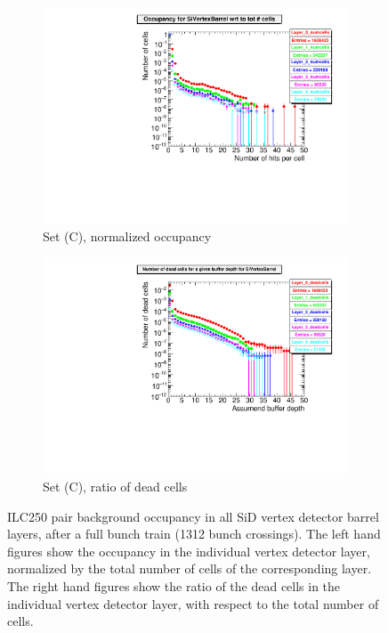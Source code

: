   \begin{figure}[htb]\ContinuedFloat
     \begin{subfigure}[b]{0.49\textwidth}
   \centering
    \includegraphics[width=\textwidth]{Figures/Pairs/occupancy_numcells_SiVertexBarrel_ILC250_SetC.pdf}
   \caption{Set (C), normalized occupancy}
   \end{subfigure}
   \hfill
    \begin{subfigure}[b]{0.49\textwidth}
   \centering
   \includegraphics[width=\textwidth]{Figures/Pairs/occupancy_deadcells_SiVertexBarrel_ILC250_SetC.pdf}
   \caption{Set (C), ratio of dead cells}
   \end{subfigure}
   \caption[Pair background occupancy in all SiD vertex detector barrel layers for the ILC250]{ILC250 pair background occupancy in all SiD vertex detector barrel layers, after a full bunch train (1312 bunch crossings).
   The left hand figures show the occupancy in the individual vertex detector layer, normalized by the total number of cells of the corresponding layer.
   The right hand figures show the ratio of the dead cells in the individual vertex detector layer, with respect to the total number of cells.
   }
   \label{fig:PairBkg:ILC250_Occupancy_Layers_VXDBarrel}
 \end{figure}
 
